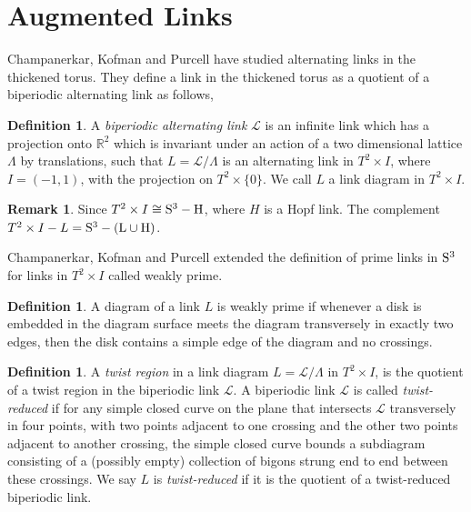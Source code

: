 \documentclass[11pt]{amsart}
\newcommand{\Sp}{\rm{S}}
\newcommand{\R}{\mathbb{R}}
\theoremstyle{plain}
\theoremstyle{definition}
\newtheorem{define}[theorem]{Definition}
\newtheorem{remark}[theorem]{Remark}
\begin{document}
 
\section{Augmented Links}
 Champanerkar, Kofman and Purcell have studied alternating links in the thickened torus. They define a link in the thickened torus as a quotient of a biperiodic alternating link as follows,
 
\begin{define}\cite{CKP2} \label{def:biperiodiclink}
 A \emph{biperiodic alternating link} $\mathcal{L}$ is an infinite link which has a projection onto $\R^2$ which is invariant under an action of a two dimensional lattice $\Lambda$ by translations, such that $L=\mathcal{L}/\Lambda$ is an alternating link in $T^2 \times I$, where $I = (-1,1)$, with the projection on $T^2 \times \{0\}$. We call $L$ a link diagram in $T^2 \times I$.   
\end{define}

\begin{remark}
Since $T^2 \times I \cong \Sp^3 - H$, where $H$ is a Hopf link. The complement $T^2 \times I- L = \Sp^3 - (L \cup H)$.
\end{remark}

Champanerkar, Kofman and Purcell \cite{CKP2} extended the definition of prime links in $\Sp^3$ for links in $T^2 \times I$ called weakly prime. 

 \begin{define} \label{def:weaklyprime}
A diagram of a link $L$ is weakly prime if whenever a disk is embedded in the diagram surface meets the diagram transversely in exactly two edges, then the disk contains a simple edge of the diagram and no crossings.
\end{define}


\begin{define}
A \emph{twist region} in a link diagram $L=\mathcal{L}/\Lambda$ in $T^2 \times I$, is the quotient of a twist region in the biperiodic link $\mathcal{L}$. %
A biperiodic link $\mathcal{L}$ is called \emph{twist-reduced} if for any simple closed curve on the plane that intersects $\mathcal{L}$ transversely in four points, with two points adjacent to one crossing and the other two points adjacent to another crossing, the simple closed
curve bounds a subdiagram consisting of a (possibly empty) collection of bigons
strung end to end between these crossings. We say $L$ is \emph{twist-reduced} if it is the quotient of a twist-reduced biperiodic link. 
\end{define}
\end{document}
